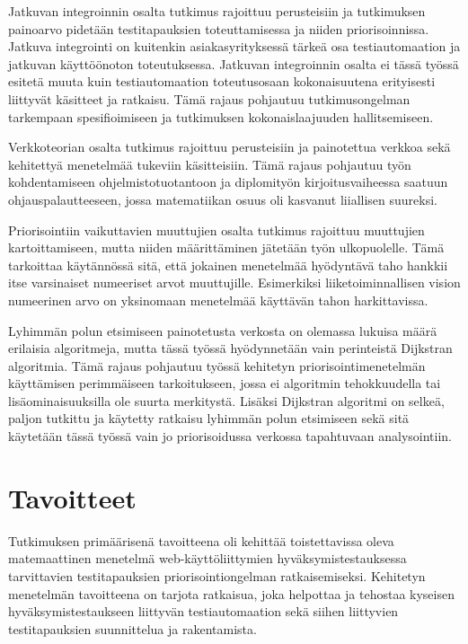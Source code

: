   Jatkuvan integroinnin osalta tutkimus rajoittuu perusteisiin ja tutkimuksen painoarvo pidetään testitapauksien toteuttamisessa ja niiden priorisoinnissa.
  Jatkuva integrointi on kuitenkin asiakasyrityksessä tärkeä osa testiautomaation ja jatkuvan käyttöönoton toteutuksessa.
  Jatkuvan integroinnin osalta ei tässä työssä esitetä muuta kuin testiautomaation toteutusosaan kokonaisuutena erityisesti liittyvät käsitteet ja ratkaisu.
  Tämä rajaus pohjautuu tutkimusongelman tarkempaan spesifioimiseen ja tutkimuksen kokonaislaajuuden hallitsemiseen.

  Verkkoteorian osalta tutkimus rajoittuu perusteisiin ja painotettua verkkoa sekä kehitettyä menetelmää tukeviin käsitteisiin.
  Tämä rajaus pohjautuu työn kohdentamiseen ohjelmistotuotantoon ja diplomityön kirjoitusvaiheessa saatuun ohjauspalautteeseen, jossa matematiikan osuus oli kasvanut liiallisen suureksi.

  Priorisointiin vaikuttavien muuttujien osalta tutkimus rajoittuu muuttujien kartoittamiseen, mutta niiden määrittäminen jätetään työn ulkopuolelle.
  Tämä tarkoittaa käytännössä sitä, että jokainen menetelmää hyödyntävä taho hankkii itse varsinaiset numeeriset arvot muuttujille.
  Esimerkiksi liiketoiminnallisen vision numeerinen arvo on yksinomaan menetelmää käyttävän tahon harkittavissa.

  Lyhimmän polun etsimiseen painotetusta verkosta on olemassa lukuisa määrä erilaisia algoritmeja, mutta tässä työssä hyödynnetään vain perinteistä Dijkstran algoritmia.
  Tämä rajaus pohjautuu työssä kehitetyn priorisointimenetelmän käyttämisen perimmäiseen tarkoitukseen, jossa ei algoritmin tehokkuudella tai lisäominaisuuksilla ole suurta merkitystä.
  Lisäksi Dijkstran algoritmi on selkeä, paljon tutkittu ja käytetty ratkaisu lyhimmän polun etsimiseen sekä sitä käytetään tässä työssä vain jo priorisoidussa verkossa tapahtuvaan analysointiin.

\section{Tavoitteet} \label{ch:06_tavoitteet}

  Tutkimuksen primäärisenä tavoitteena oli kehittää toistettavissa oleva matemaattinen menetelmä web-käyttöliittymien hyväksymistestauksessa tarvittavien testitapauksien priorisointiongelman ratkaisemiseksi.
  Kehitetyn menetelmän tavoitteena on tarjota ratkaisua, joka helpottaa ja tehostaa kyseisen hyväksymistestaukseen liittyvän testiautomaation sekä siihen liittyvien testitapauksien suunnittelua ja rakentamista.

